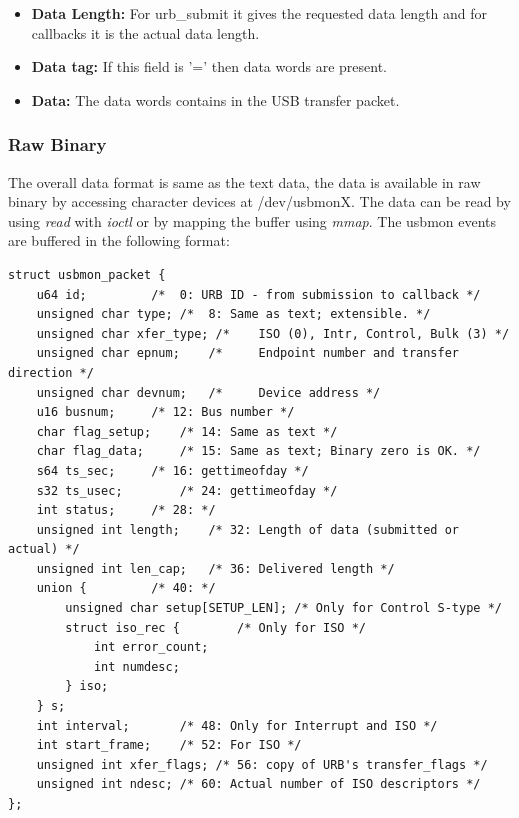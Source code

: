 \begin{itemize}
\item{\textbf{Data Length:} For urb\_submit it gives the requested data length and for callbacks it is the actual data length.}

\item{\textbf{Data tag:} If this field is '=' then data words are present.}

\item{\textbf{Data:} The data words contains in the USB transfer packet.}
\end{itemize}

\subsubsection{Raw Binary}
The overall data format is same as the text data, the data is available in raw binary by accessing character devices at /dev/usbmonX. The data can be read by using \textit{read} with \textit{ioctl} or by mapping the buffer using \textit{mmap}. The usbmon events are buffered in the following format:

\begingroup
\centering\scriptsize\begin{lstlisting}
struct usbmon_packet {
	u64 id;			/*  0: URB ID - from submission to callback */
	unsigned char type;	/*  8: Same as text; extensible. */
	unsigned char xfer_type; /*    ISO (0), Intr, Control, Bulk (3) */
	unsigned char epnum;	/*     Endpoint number and transfer direction */
	unsigned char devnum;	/*     Device address */
	u16 busnum;		/* 12: Bus number */
	char flag_setup;	/* 14: Same as text */
	char flag_data;		/* 15: Same as text; Binary zero is OK. */
	s64 ts_sec;		/* 16: gettimeofday */
	s32 ts_usec;		/* 24: gettimeofday */
	int status;		/* 28: */
	unsigned int length;	/* 32: Length of data (submitted or actual) */
	unsigned int len_cap;	/* 36: Delivered length */
	union {			/* 40: */
		unsigned char setup[SETUP_LEN];	/* Only for Control S-type */
		struct iso_rec {		/* Only for ISO */
			int error_count;
			int numdesc;
		} iso;
	} s;
	int interval;		/* 48: Only for Interrupt and ISO */
	int start_frame;	/* 52: For ISO */
	unsigned int xfer_flags; /* 56: copy of URB's transfer_flags */
	unsigned int ndesc;	/* 60: Actual number of ISO descriptors */
};	
\end{lstlisting}
\endgroup
